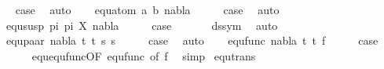 \begin{isabellebody}
\ \isamarkupfalse%
\ {\isacharquery}{\kern0pt}case\ \isamarkupfalse%
\ auto\isanewline
{}\isamarkupfalse%
\isanewline
\ \ \isamarkupfalse%
\ {\isacharparenleft}{\kern0pt}equ{\isacharunderscore}{\kern0pt}atom\ a\ b\ nabla{\isacharparenright}{\kern0pt}\isanewline
\ \ \isamarkupfalse%
\ \isamarkupfalse%
\ {\isacharquery}{\kern0pt}case\ \isamarkupfalse%
\ auto\isanewline
{}\isamarkupfalse%
\isanewline
\ \ \isamarkupfalse%
\ {\isacharparenleft}{\kern0pt}equ{\isacharunderscore}{\kern0pt}susp\ pi{}\ pi{}\ X\ nabla{\isacharparenright}{\kern0pt}\isanewline
\ \ \isamarkupfalse%
\ \isamarkupfalse%
\ {\isacharquery}{\kern0pt}case\ \isanewline
\ \ \ \ \isamarkupfalse%
\ ds{\isacharunderscore}{\kern0pt}sym\ \isamarkupfalse%
\ auto\isanewline
{}\isamarkupfalse%
\isanewline
\ \ \isamarkupfalse%
\ {\isacharparenleft}{\kern0pt}equ{\isacharunderscore}{\kern0pt}paar\ nabla\ t{}{\isacharprime}{\kern0pt}\ t{}{\isacharprime}{\kern0pt}\ s{}{\isacharprime}{\kern0pt}\ s{}{\isacharprime}{\kern0pt}{\isacharparenright}{\kern0pt}\isanewline
\ \ \isamarkupfalse%
\ \isamarkupfalse%
\ {\isacharquery}{\kern0pt}case\ \isamarkupfalse%
\ auto\isanewline
{}\isamarkupfalse%
\isanewline
\ \ \isamarkupfalse%
\ {\isacharparenleft}{\kern0pt}equ{\isacharunderscore}{\kern0pt}func\ nabla\ t{}{\isacharprime}{\kern0pt}\ t{}{\isacharprime}{\kern0pt}\ f{\isacharparenright}{\kern0pt}\isanewline
\ \ \isamarkupfalse%
\ \isamarkupfalse%
\ {\isacharquery}{\kern0pt}case\ \isanewline
\ \ \ \ \isamarkupfalse%
\ equ{\isachardot}{\kern0pt}equ{\isacharunderscore}{\kern0pt}func{\isacharbrackleft}{\kern0pt}OF\ equ{\isacharunderscore}{\kern0pt}func{\isacharparenleft}{\kern0pt}{}{\isacharparenright}{\kern0pt}{\isacharcomma}{\kern0pt}\ of\ f{\isacharbrackright}{\kern0pt}\ \isamarkupfalse%
\ simp\isanewline
{}\isamarkupfalse%
%
\endisatagproof
{\isafoldproof}%
%
\isadelimproof
\isanewline
%
\endisadelimproof
\isanewline
{}\isamarkupfalse%
\ equ{\isacharunderscore}{\kern0pt}trans{\isacharcolon}{\kern0pt}\isanewline

\end{isabellebody}
